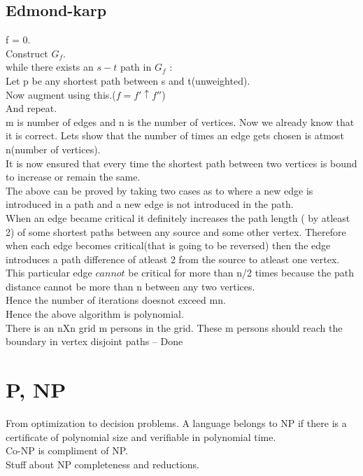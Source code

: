\documentclass[solution,addpoints,12pt]{exam}
\begin{document}
\subsection{Edmond-karp}
f = 0.\\
Construct $G_f$.\\
while there exists an $s-t$ path in $G_f$ :\\
Let p be any shortest path between s and t(unweighted).\\
Now augment using this.($f = f' \uparrow f''$)\\
And repeat.\\
m is number of edges and n is the number of vertices.
Now we already know that it is correct. Lets show that the number of times
an edge gets chosen is atmost n(number of vertices).\\
It is now ensured that every time the shortest path between two vertices is
bound to increase or remain the same.\\
The above can be proved by taking two cases as to where a new edge is
introduced in a path and a new edge is not introduced in the path.\\
When an edge became critical it definitely increases the path length
( by atleast 2) of some shortest paths between any source and some other vertex.
Therefore when each edge becomes critical(that is going to be reversed) then
the edge introduces a path difference of atleast 2 from the source to atleast one vertex. This particular edge $cannot$ be critical for more than n/2 times because the
path distance cannot be more than n between any two vertices.\\
Hence the number of iterations doesnot exceed mn.\\
Hence the above algorithm is polynomial.\\

There is an nXn grid m persons in the grid. These m persons should
reach the boundary in vertex disjoint paths -- Done

\section{P, NP}
From  optimization to decision problems.
A language belongs to NP if there is a certificate of polynomial
size and verifiable in polynomial time.\\
Co-NP is compliment of NP.\\
Stuff about NP completeness and reductions.
\end{document}
